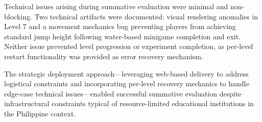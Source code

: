 Technical issues arising during summative evaluation were minimal and non-blocking. Two technical artifacts were documented: visual rendering anomalies in Level 7 and a movement mechanics bug preventing players from achieving standard jump height following water-based minigame completion and exit. Neither issue prevented level progression or experiment completion, as per-level restart functionality was provided as error recovery mechanism.

The strategic deployment approach---leveraging web-based delivery to address logistical constraints and incorporating per-level recovery mechanics to handle edge-case technical issues---enabled successful summative evaluation despite infrastructural constraints typical of resource-limited educational institutions in the Philippine context.

